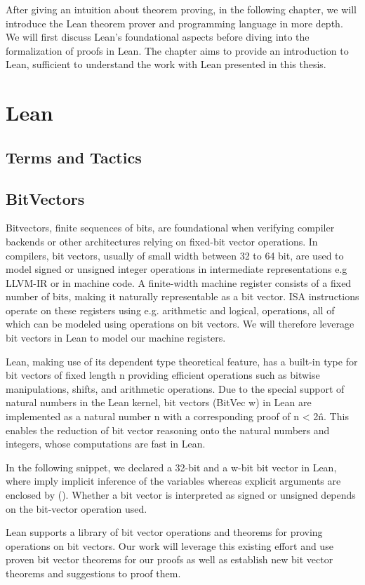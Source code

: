 After giving an intuition about theorem proving, in the following chapter, we will introduce the Lean theorem prover and programming language in more depth. We will first discuss Lean’s foundational aspects before diving into the formalization of proofs in Lean. The chapter aims to provide an introduction to Lean, sufficient to understand the work with Lean presented in this thesis.

\section{Lean} 
        \subsection{Terms and Tactics} 
\subsection{BitVectors} 
Bitvectors, finite sequences of bits, are foundational when verifying compiler backends or other architectures relying on fixed-bit vector operations. In compilers, bit vectors, usually of small width between 32 to 64 bit, are used to model signed or unsigned integer operations in intermediate representations e.g LLVM-IR or in machine code. A finite-width machine register consists of a fixed number of bits, making it naturally representable as a bit vector. ISA instructions operate on these registers using e.g. arithmetic and logical, operations, all of which can be modeled using operations on bit vectors. We will therefore leverage bit vectors in Lean to model our machine registers.

Lean, making use of its dependent type theoretical feature, has a built-in type for bit vectors of fixed length n providing efficient operations such as bitwise manipulations, shifts, and arithmetic operations. 
Due to the special support of natural numbers in the Lean kernel, bit vectors (BitVec w) in Lean are implemented as a natural number n with a corresponding proof of n < 2\^n. This enables the reduction of bit vector reasoning onto the natural numbers and integers, whose computations are fast in Lean.

In the following snippet, we declared a 32-bit and a w-bit bit vector in Lean, where {} imply implicit inference of the variables whereas explicit arguments are enclosed by (). Whether a bit vector is interpreted as signed or unsigned depends on the bit-vector operation used. 

Lean supports a library of bit vector operations and theorems for proving operations on bit vectors.  Our work will leverage this existing effort and use proven bit vector theorems for our proofs as well as establish new bit vector theorems and suggestions to proof them. 

